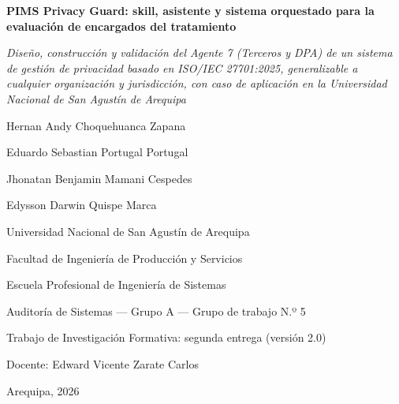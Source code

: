 \documentclass[12pt,letterpaper]{article}
\begin{document}
\begin{titlepage}
\thispagestyle{empty}
\centering
\vspace*{2.2cm}

{\bfseries PIMS Privacy Guard: skill, asistente y sistema orquestado para la evaluación de encargados del tratamiento\par}
\vspace{12pt}
{\itshape Diseño, construcción y validación del Agente 7 (Terceros y DPA) de un sistema de gestión de privacidad basado en ISO/IEC 27701:2025, generalizable a cualquier organización y jurisdicción, con caso de aplicación en la Universidad Nacional de San Agustín de Arequipa\par}

\vspace{1.6cm}

Hernan Andy Choquehuanca Zapana\par
Eduardo Sebastian Portugal Portugal\par
Jhonatan Benjamin Mamani Cespedes\par
Edysson Darwin Quispe Marca\par

\vspace{1.2cm}

Universidad Nacional de San Agustín de Arequipa\par
Facultad de Ingeniería de Producción y Servicios\par
Escuela Profesional de Ingeniería de Sistemas\par

\vspace{12pt}

Auditoría de Sistemas --- Grupo A --- Grupo de trabajo N.º 5\par
Trabajo de Investigación Formativa: segunda entrega (versión 2.0)\par

\vspace{12pt}

Docente: Edward Vicente Zarate Carlos\par

\vspace{12pt}

Arequipa, 2026\par

\vfill

\end{titlepage}
\end{document}
